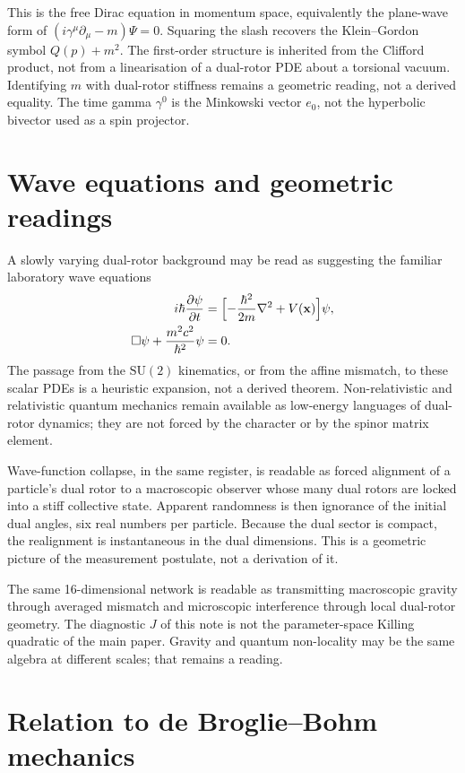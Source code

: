 \documentclass[a4paper]{article}
\begin{document}
This is the free Dirac equation in momentum space, equivalently the plane-wave form of \((i\gamma^{\mu}\partial_{\mu}-m)\Psi=0\). Squaring the slash recovers the Klein--Gordon symbol \(Q(p)+m^2\). The first-order structure is inherited from the Clifford product, not from a linearisation of a dual-rotor PDE about a torsional vacuum. Identifying \(m\) with dual-rotor stiffness remains a geometric reading, not a derived equality. The time gamma \(\gamma^0\) is the Minkowski vector \(e_0\), not the hyperbolic bivector used as a spin projector.

\section{Wave equations and geometric readings}

A slowly varying dual-rotor background may be read as suggesting the familiar laboratory wave equations
\begin{align}
i\hbar\frac{\partial\psi}{\partial t}
  &=\Bigl[-\frac{\hbar^2}{2m}\nabla^2+V(\mathbf{x})\Bigr]\psi, \\
\square\psi+\frac{m^2c^2}{\hbar^2}\psi&=0.
\end{align}
The passage from the \(\mathrm{SU}(2)\) kinematics, or from the affine mismatch, to these scalar PDEs is a heuristic expansion, not a derived theorem. Non-relativistic and relativistic quantum mechanics remain available as low-energy languages of dual-rotor dynamics; they are not forced by the character or by the spinor matrix element.

Wave-function collapse, in the same register, is readable as forced alignment of a particle's dual rotor to a macroscopic observer whose many dual rotors are locked into a stiff collective state. Apparent randomness is then ignorance of the initial dual angles, six real numbers per particle. Because the dual sector is compact, the realignment is instantaneous in the dual dimensions. This is a geometric picture of the measurement postulate, not a derivation of it.

The same 16-dimensional network is readable as transmitting macroscopic gravity through averaged mismatch and microscopic interference through local dual-rotor geometry. The diagnostic \(J\) of this note is not the parameter-space Killing quadratic of the main paper. Gravity and quantum non-locality may be the same algebra at different scales; that remains a reading.

\section{Relation to de Broglie--Bohm mechanics}
\end{document}
